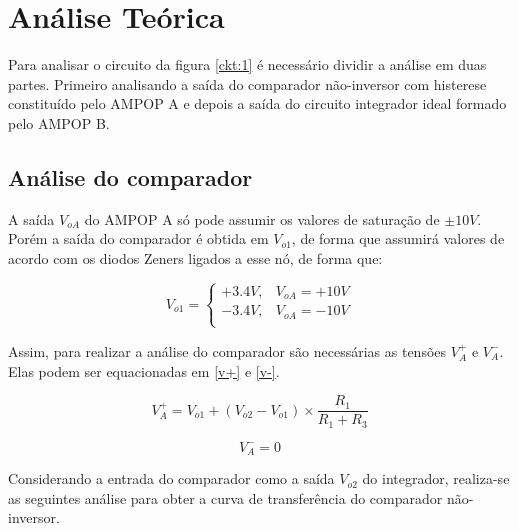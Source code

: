 \setlength{\abovedisplayskip}{-25pt}
\setlength{\belowdisplayskip}{-25pt}

\section{Análise Teórica}

Para analisar o circuito da figura \ref{ckt:1} é necessário dividir a análise em duas partes. Primeiro analisando a saída do comparador não-inversor com histerese constituído pelo AMPOP A e depois a saída do circuito integrador ideal formado pelo AMPOP B.

\subsection{Análise do comparador}

A saída $V_{oA}$ do AMPOP A só pode assumir os valores de saturação de $\pm 10 V$. Porém a saída do comparador é obtida em $V_{o1}$, de forma que assumirá valores de acordo com os diodos Zeners ligados a esse nó, de forma que:

\begin{equation} \label{vo1+}
V_{o1} =
\left \{
\begin{array}{cc}
+3.4 V, & V_{oA} = +10 V \\
-3.4 V, & V_{oA} = -10 V \\
\end{array}
\right.
\end{equation}

Assim, para realizar a análise do comparador são necessárias as tensões $V_{A}^{+}$ e $V_{A}^{-}$. Elas podem ser equacionadas em \ref{v+} e \ref{v-}.

\begin{equation} \label{v+}
V_{A}^{+} = V_{o1} + (V_{o2}-V_{o1}) \times \frac{R_1}{R_1 + R_3}
\end{equation}

\begin{equation} \label{v-}
V_{A}^{-} = 0
\end{equation}

Considerando a entrada do comparador como a saída $V_{o2}$ do integrador, realiza-se as seguintes análise para obter a curva de transferência do comparador não-inversor.

